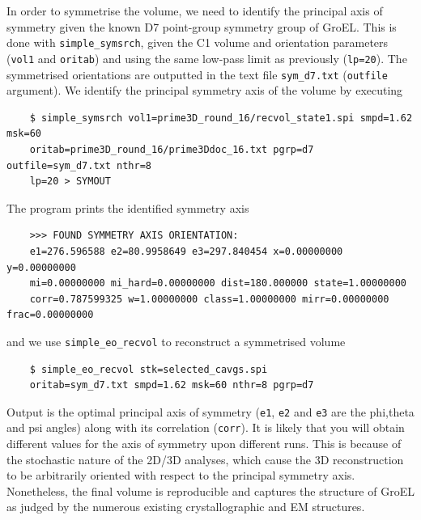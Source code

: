 \documentclass[a4paper,11pt]{article}
\newcommand{\prgname}[1]{\textcolor{NavyBlue}{\texttt{#1}}}
\begin{document}
In order to symmetrise the volume, we need to identify the principal axis of symmetry given the known D7 point-group symmetry group of GroEL. This is done with \prgname{simple\_symsrch}, given the C1 volume and orientation parameters (\texttt{vol1} and \texttt{oritab}) and using the same low-pass limit as previously (\texttt{lp=20}). The symmetrised orientations are outputted in the text file \texttt{sym\_d7.txt} (\texttt{outfile} argument). We identify the principal symmetry axis of the volume by executing 
\begin{verbatim}
    $ simple_symsrch vol1=prime3D_round_16/recvol_state1.spi smpd=1.62 msk=60 
    oritab=prime3D_round_16/prime3Ddoc_16.txt pgrp=d7 outfile=sym_d7.txt nthr=8 
    lp=20 > SYMOUT
\end{verbatim}
The program prints the identified symmetry axis
\begin{verbatim}
    >>> FOUND SYMMETRY AXIS ORIENTATION:
    e1=276.596588 e2=80.9958649 e3=297.840454 x=0.00000000 y=0.00000000 
    mi=0.00000000 mi_hard=0.00000000 dist=180.000000 state=1.00000000 
    corr=0.787599325 w=1.00000000 class=1.00000000 mirr=0.00000000 frac=0.00000000
\end{verbatim}
and we use \prgname{simple\_eo\_recvol} to reconstruct a symmetrised volume
\begin{verbatim}
    $ simple_eo_recvol stk=selected_cavgs.spi 
    oritab=sym_d7.txt smpd=1.62 msk=60 nthr=8 pgrp=d7
\end{verbatim}
Output is the optimal principal axis of symmetry (\texttt{e1}, \texttt{e2} and \texttt{e3} are the phi,theta and psi angles) along with its correlation (\texttt{corr}). It is likely that you will obtain different values for the axis of symmetry upon different runs. This is because of the stochastic nature of the 2D/3D analyses, which cause the 3D reconstruction to be arbitrarily oriented with respect to the principal symmetry axis. Nonetheless, the final volume is reproducible and captures the structure of GroEL as judged by the numerous existing crystallographic and EM structures.
\end{document}
